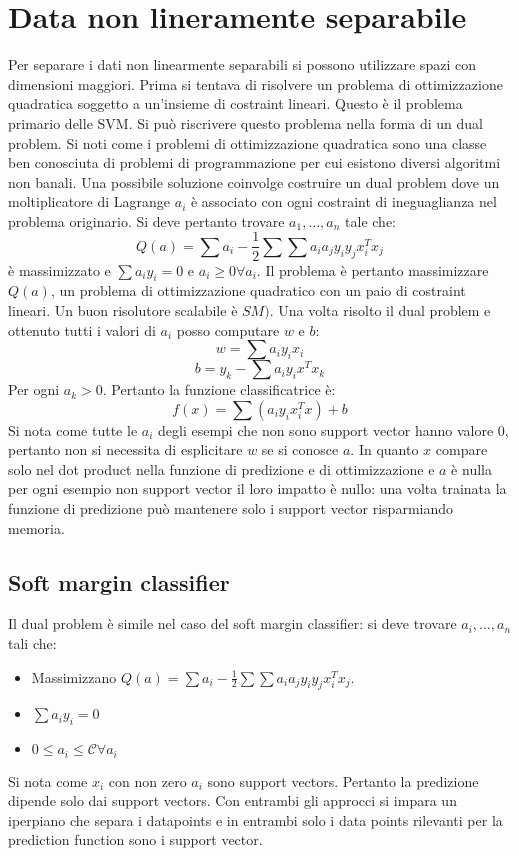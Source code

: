 \section{Data non lineramente separabile}
Per separare i dati non linearmente separabili si possono utilizzare spazi con dimensioni maggiori.
Prima si tentava di risolvere un problema di ottimizzazione quadratica soggetto a un'insieme di costraint lineari.
Questo \`e il problema primario delle SVM.
Si pu\`o riscrivere questo problema nella forma di un dual problem.
Si noti come i problemi di ottimizzazione quadratica sono una classe ben conosciuta di problemi di programmazione per cui esistono diversi algoritmi non banali.
Una possibile soluzione coinvolge costruire un dual problem dove un moltiplicatore di Lagrange $a_i$ \`e associato con ogni costraint di ineguaglianza nel problema originario.
Si deve pertanto trovare $a_1,\dots,a_n$ tale che:
$$Q(a) = \sum a_i - \frac{1}{2}\sum\sum a_ia_jy_iy_jx_i^Tx_j$$
\`e massimizzato e $\sum a_iy_i = 0$ e $a_i\ge 0\forall a_i$.
Il problema \`e pertanto massimizzare $Q(a)$, un problema di ottimizzazione quadratico con un paio di costraint lineari.
Un buon risolutore scalabile \`e $SM)$.
Una volta risolto il dual problem e ottenuto tutti i valori di $a_i$ posso computare $w$ e $b$:
$$w=\sum a_iy_ix_i$$
$$b = y_k - \sum a_iy_ix^Tx_k$$
Per ogni $a_k>0$.
Pertanto la funzione classificatrice \`e:
$$f(x) = \sum(a_iy_ix_i^Tx)+b$$
Si nota come tutte le $a_i$ degli esempi che non sono support vector hanno valore $0$, pertanto non si necessita di esplicitare $w$ se si conosce $a$.
In quanto $x$ compare solo nel dot product nella funzione di predizione e di ottimizzazione e $a$ \`e nulla per ogni esempio non support vector il loro impatto \`e nullo: una volta trainata la funzione di predizione pu\`o mantenere solo i support vector risparmiando memoria.

	\subsection{Soft margin classifier}
	Il dual problem \`e simile nel caso del soft margin classifier: si deve trovare $a_i,\dots, a_n$ tali che:
	\begin{itemize}
		\item Massimizzano $Q(a) = \sum a_i-\frac{1}{2}\sum\sum a_ia_jy_iy_jx_i^Tx_j$.
		\item $\sum a_iy_i = 0$
		\item $0\le a_i\le \mathcal{C}\forall a_i$
	\end{itemize}
	Si nota come $x_i$ con non zero $a_i$ sono support vectors.
	Pertanto la predizione dipende solo dai support vectors.
	Con entrambi gli approcci si impara un iperpiano che separa i datapoints e in entrambi solo i data points rilevanti per la prediction function sono i support vector.

